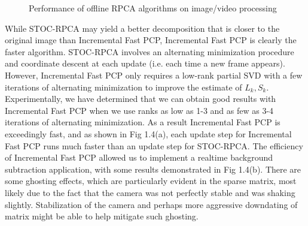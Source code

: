 \documentclass[oneside]{article}
\begin{document}
\begin{figure}[ht]
\centering
{}
\caption[]{Performance of offline RPCA algorithms on image/video processing}
\end{figure}
While STOC-RPCA may yield a better decomposition that is closer to the original image than Incremental Fast PCP, Incremental Fast PCP is clearly the faster algorithm. STOC-RPCA involves an alternating minimization procedure and coordinate descent at each update (i.e. each time a new frame appears). However, Incremental Fast PCP only requires a low-rank partial SVD with a few iterations of alternating minimization to improve the estimate of $L_{k}, S_{k}$. Experimentally, we have determined that we can obtain good results with Incremental Fast PCP when we use ranks as low as 1-3 and as few as 3-4 iterations of alternating minimization. As a result Incremental Fast PCP is exceedingly fast, and as shown in Fig 1.4(a), each update step for Incremental Fast PCP runs much faster than an update step for STOC-RPCA. The efficiency of Incremental Fast PCP allowed us to implement a realtime background subtraction application, with some results demonstrated in Fig 1.4(b). There are some ghosting effects, which are particularly evident in the sparse matrix, most likely due to the fact that the camera was not perfectly stable and was shaking slightly. Stabilization of the camera and perhaps more aggressive downdating of matrix might be able to help mitigate such ghosting.
\end{document}
